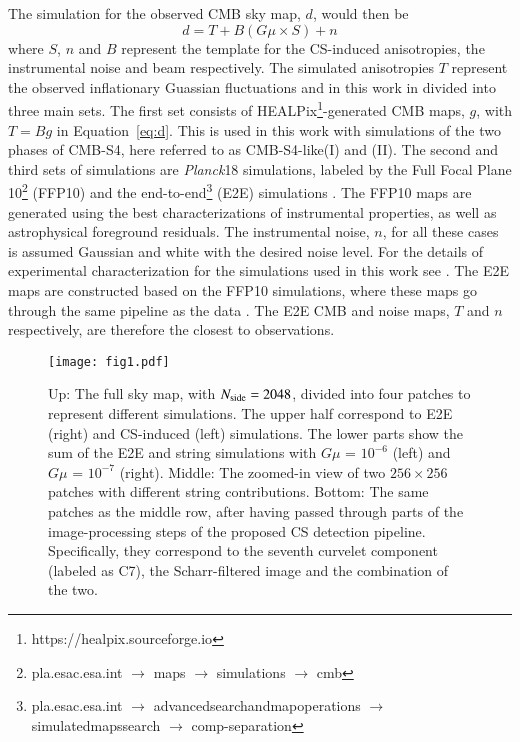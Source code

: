 \documentclass[fleqn,usenatbib]{mnras}
\begin{document}
The  simulation for the observed CMB sky map, $d$, would then be
\begin{equation}
\label{eq:d}
d = T+ B \left(G\mu \times S\right) + n
\end{equation}
 where $S$, $n$ and $B$ represent the template for the CS-induced anisotropies, the instrumental noise and beam respectively. 
 The simulated anisotropies $T$ represent the observed inflationary Guassian fluctuations and in this work in divided into three main sets. 
%
The first set consists of HEALPix\footnote{https://healpix.sourceforge.io}-generated CMB maps, $g$, with $T=Bg$ in Equation~\ref{eq:d}.
This is used in this work with simulations of the two phases of CMB-S4, here referred to as CMB-S4-like(I) and (II).  
The second and third sets of simulations are {\it Planck}18 simulations, labeled by the Full Focal Plane 10\footnote{pla.esac.esa.int $\to$ maps $\to$ simulations $\to$ cmb} (FFP10)  and the end-to-end\footnote{pla.esac.esa.int $\to$ advanced\;search\;and\;map\;operations $\to$ simulated\;maps\;search $\to$ comp-separation} (E2E) simulations \citep{ade2016planck}.
%
The FFP10 maps are generated using the best characterizations of instrumental properties, as well as astrophysical foreground residuals. 
The instrumental noise, $n$, for all these cases is assumed  Gaussian and white  with the desired noise level. 
 For the details of experimental characterization for the simulations used in this work see \cite{vaf18}. 
%
The E2E maps are constructed based on the FFP10 simulations, where these maps go through the same pipeline as the data \citep{akrami2019planck,ade2016planck}. The E2E CMB and noise  maps, $T$ and $n$ respectively, are therefore the closest to observations. %
 
\begin{figure*}
	\centering	
	\texttt{[image: fig1.pdf]}
	\caption{Up: The full sky map, with $N_{\rm side}=2048$, divided into four patches to represent different simulations. The upper half correspond to E2E (right) and CS-induced (left) simulations. The lower parts show the sum of the E2E and string simulations with $G\mu$ = $10^{-6}$ (left) and $G\mu$ = $10^{-7}$ (right).
	Middle: The zoomed-in view of two $256\times256$ patches with different string contributions. 
	Bottom: The same patches as the middle row, after having passed through parts of the image-processing steps of the proposed CS detection pipeline. Specifically, they correspond to the seventh curvelet component (labeled as C7), the Scharr-filtered image and the combination of the two.}
	\label{fig:CMB}
\end{figure*}
\end{document}
